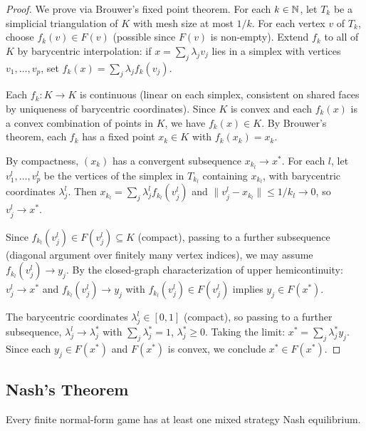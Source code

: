\documentclass[11pt,a4paper]{article}
\begin{document}
\begin{proof}
We prove via Brouwer's fixed point theorem. For each $k \in \mathbb{N}$, let $T_k$
be a simplicial triangulation of $K$ with mesh size at most $1/k$. For each
vertex $v$ of $T_k$, choose $f_k(v) \in F(v)$ (possible since $F(v)$ is
non-empty). Extend $f_k$ to all of $K$ by barycentric interpolation: if
$x = \sum_j \lambda_j v_j$ lies in a simplex with vertices $v_1, \ldots, v_p$,
set $f_k(x) = \sum_j \lambda_j f_k(v_j)$.

Each $f_k : K \to K$ is continuous (linear on each simplex, consistent on
shared faces by uniqueness of barycentric coordinates). Since $K$ is convex
and each $f_k(x)$ is a convex combination of points in $K$, we have
$f_k(x) \in K$. By Brouwer's theorem, each $f_k$ has a fixed point
$x_k \in K$ with $f_k(x_k) = x_k$.

By compactness, $(x_k)$ has a convergent subsequence $x_{k_l} \to x^*$.
For each $l$, let $v_1^l, \ldots, v_p^l$ be the vertices of the simplex in
$T_{k_l}$ containing $x_{k_l}$, with barycentric coordinates $\lambda_j^l$.
Then $x_{k_l} = \sum_j \lambda_j^l f_{k_l}(v_j^l)$ and
$\|v_j^l - x_{k_l}\| \leq 1/k_l \to 0$, so $v_j^l \to x^*$.

Since $f_{k_l}(v_j^l) \in F(v_j^l) \subseteq K$ (compact), passing to a
further subsequence (diagonal argument over finitely many vertex indices),
we may assume $f_{k_l}(v_j^l) \to y_j$. By the closed-graph
characterization of upper hemicontinuity: $v_j^l \to x^*$ and
$f_{k_l}(v_j^l) \to y_j$ with $f_{k_l}(v_j^l) \in F(v_j^l)$ implies
$y_j \in F(x^*)$.

The barycentric coordinates $\lambda_j^l \in [0,1]$ (compact), so passing
to a further subsequence, $\lambda_j^l \to \lambda_j^*$ with
$\sum_j \lambda_j^* = 1$, $\lambda_j^* \geq 0$. Taking the limit:
$x^* = \sum_j \lambda_j^* y_j$. Since each $y_j \in F(x^*)$ and $F(x^*)$
is convex, we conclude $x^* \in F(x^*)$.
\end{proof}

\subsection{Nash's Theorem}
\label{subsec:nash_theorem}

\begin{keyresult}
\begin{theorem}[Nash, 1950]
\label{thm:nash_existence}
Every finite normal-form game has at least one mixed strategy Nash
equilibrium.
\end{theorem}
\end{keyresult}
\end{document}
